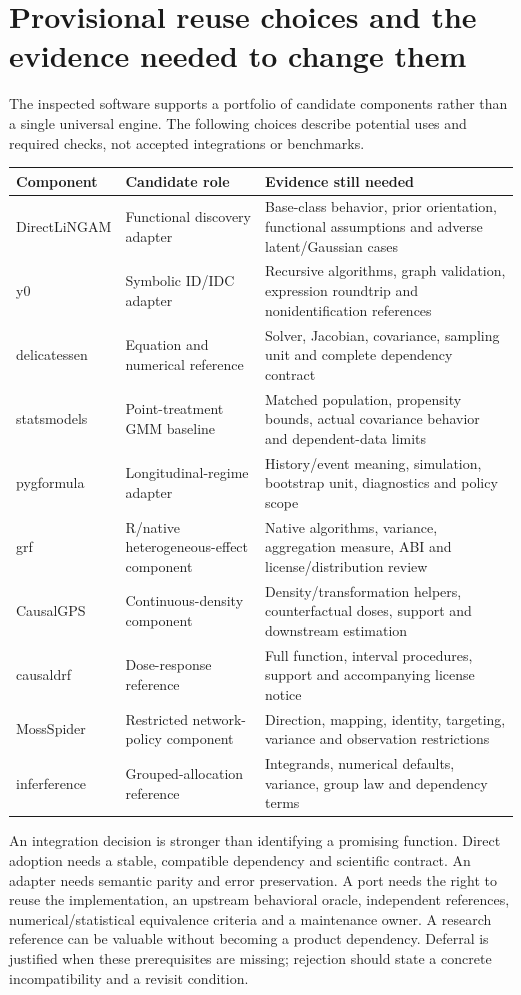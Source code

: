 \section{Provisional reuse choices and the evidence needed to change them}

The inspected software supports a portfolio of candidate components rather
than a single universal engine. The following choices describe potential uses
and required checks, not accepted integrations or benchmarks.

\begin{longtable}{p{}p{}p{}}
\toprule
Component & Candidate role & Evidence still needed\\
\midrule
\endhead
DirectLiNGAM & Functional discovery adapter & Base-class behavior, prior orientation,
functional assumptions and adverse latent/Gaussian cases\\
y0 & Symbolic ID/IDC adapter & Recursive algorithms, graph validation,
expression roundtrip and nonidentification references\\
delicatessen & Equation and numerical reference & Solver, Jacobian, covariance,
sampling unit and complete dependency contract\\
statsmodels & Point-treatment GMM baseline & Matched population, propensity bounds,
actual covariance behavior and dependent-data limits\\
pygformula & Longitudinal-regime adapter & History/event meaning, simulation,
bootstrap unit, diagnostics and policy scope\\
grf & R/native heterogeneous-effect component & Native algorithms, variance,
aggregation measure, ABI and license/distribution review\\
CausalGPS & Continuous-density component & Density/transformation helpers,
counterfactual doses, support and downstream estimation\\
causaldrf & Dose-response reference & Full function, interval procedures,
support and accompanying license notice\\
MossSpider & Restricted network-policy component & Direction, mapping, identity,
targeting, variance and observation restrictions\\
inferference & Grouped-allocation reference & Integrands, numerical defaults,
variance, group law and dependency terms\\
\bottomrule
\end{longtable}

An integration decision is stronger than identifying a promising function.
Direct adoption needs a stable, compatible dependency and scientific contract.
An adapter needs semantic parity and error preservation. A port needs the right
to reuse the implementation, an upstream behavioral oracle, independent
references, numerical/statistical equivalence criteria and a maintenance owner.
A research reference can be valuable without becoming a product dependency.
Deferral is justified when these prerequisites are missing; rejection should
state a concrete incompatibility and a revisit condition.

